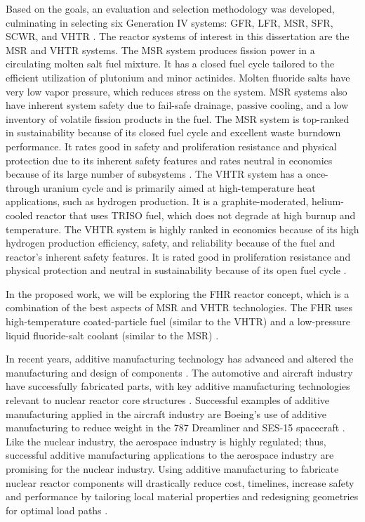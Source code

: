 Based on the goals, an evaluation and selection methodology was developed, 
culminating in selecting six Generation IV systems: \gls{GFR}, 
\gls{LFR}, \gls{MSR}, \gls{SFR}, \gls{SCWR}, and \gls{VHTR} \cite{gif_technology_2002}. 
The reactor systems of interest in this dissertation are the \gls{MSR} and 
\gls{VHTR} systems. 
The MSR system produces fission power in a circulating molten salt fuel mixture. 
It has a closed fuel cycle tailored to the efficient utilization of plutonium 
and minor actinides. 
Molten fluoride salts have very low vapor pressure, which reduces stress on the 
system. 
MSR systems also have inherent system safety due to fail-safe drainage, 
passive cooling, and a low inventory of volatile fission products in the fuel. 
The MSR system is top-ranked in sustainability because of its closed fuel cycle 
and excellent waste burndown performance. 
It rates good in safety and proliferation resistance and physical protection 
due to its inherent safety features and rates neutral in economics because of
its large number of subsystems \cite{gif_technology_2002}.  
The \gls{VHTR} system has a once-through uranium cycle and is primarily aimed at 
high-temperature heat applications, such as hydrogen production. 
It is a graphite-moderated, helium-cooled reactor that uses \gls{TRISO} fuel, 
which does not degrade at high burnup and temperature.  
The \gls{VHTR} system is highly ranked in economics because of its high hydrogen 
production efficiency, safety, and reliability because of the fuel and reactor's 
inherent safety features. 
It is rated good in proliferation resistance and physical protection and 
neutral in sustainability because of its open fuel cycle \cite{gif_technology_2002}. 

In the proposed work, we will be exploring the \gls{FHR} reactor concept, which 
is a combination of the best aspects of \gls{MSR} and \gls{VHTR} technologies. 
The \gls{FHR} uses high-temperature coated-particle fuel (similar to the \gls{VHTR}) 
and a low-pressure liquid fluoride-salt coolant (similar to the \gls{MSR})
\cite{forsberg_fluoride-salt-cooled_2012,facilitators_fluoride-salt-cooled_2013}.

In recent years, additive manufacturing technology has advanced and altered the
manufacturing and design of components \cite{simpson_considerations_2019}. 
The automotive and aircraft industry have successfully fabricated parts, with 
key additive manufacturing technologies relevant to nuclear reactor core 
structures \cite{murr_frontiers_2016}.  
Successful examples of additive manufacturing applied in the aircraft industry 
are Boeing’s use of additive manufacturing to reduce weight in the 787 Dreamliner
\cite{noauthor_printed_2017} and SES-15 spacecraft \cite{noauthor_boeing_nodate}. 
Like the nuclear industry, the aerospace industry is highly regulated; thus, 
successful additive manufacturing applications to the aerospace industry are 
promising for the nuclear industry. 
Using additive manufacturing to fabricate nuclear reactor components will 
drastically reduce cost, timelines, increase safety and performance by 
tailoring local material properties and redesigning geometries for optimal load paths 
\cite{simpson_considerations_2019}. 

